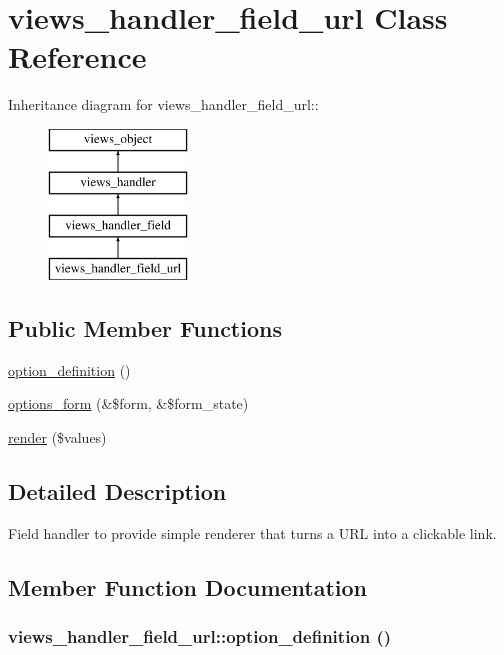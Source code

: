 \hypertarget{classviews__handler__field__url}{
\section{views\_\-handler\_\-field\_\-url Class Reference}
\label{classviews__handler__field__url}
}
Inheritance diagram for views\_\-handler\_\-field\_\-url::\begin{figure}[H]
\begin{center}
\leavevmode
\includegraphics[height=4cm]{classviews__handler__field__url}
\end{center}
\end{figure}
\subsection*{Public Member Functions}
\begin{CompactItemize}
\item 
\hyperlink{classviews__handler__field__url_0b9b0b58eb2fbe175927c6e16d9142f9}{option\_\-definition} ()
\item 
\hyperlink{classviews__handler__field__url_47ffe90c19fe1a114df84f5779567cd3}{options\_\-form} (\&\$form, \&\$form\_\-state)
\item 
\hyperlink{classviews__handler__field__url_6f96c8adfdd1892619793359448e70ad}{render} (\$values)
\end{CompactItemize}


\subsection{Detailed Description}
Field handler to provide simple renderer that turns a URL into a clickable link. 

\subsection{Member Function Documentation}
\hypertarget{classviews__handler__field__url_0b9b0b58eb2fbe175927c6e16d9142f9}{
\subsubsection[{option\_\-definition}]{\setlength{\rightskip}{0pt plus 5cm}views\_\-handler\_\-field\_\-url::option\_\-definition ()}}
\label{classviews__handler__field__url_0b9b0b58eb2fbe175927c6e16d9142f9}


